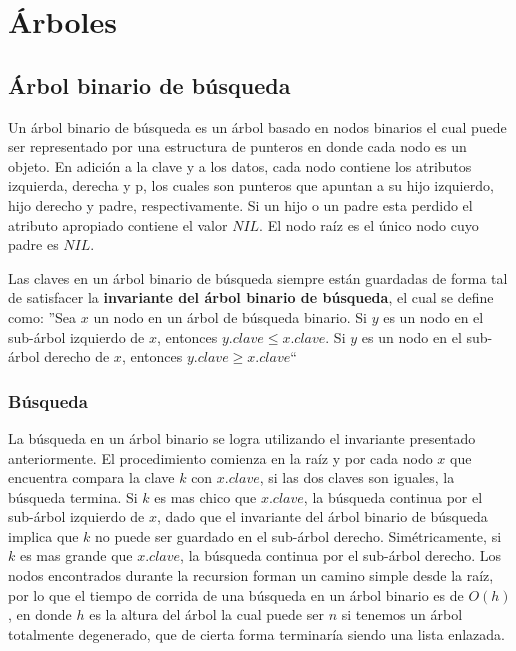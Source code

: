 \newpage
\section{\'Arboles}
\subsection{\'Arbol binario de b\'usqueda}

Un \'arbol binario de b\'usqueda es un \'arbol basado en nodos binarios el cual puede ser representado por una estructura de punteros en donde cada nodo es un objeto. En adici\'on a la clave y a los datos, cada nodo contiene los atributos izquierda, derecha y p, los cuales son punteros que apuntan a su hijo izquierdo, hijo derecho y padre, respectivamente. Si un hijo o un padre esta perdido el atributo apropiado contiene el valor $NIL$. El nodo ra\'iz es el \'unico nodo cuyo padre es $NIL$.

Las claves en un \'arbol binario de b\'usqueda siempre est\'an guardadas de forma tal de satisfacer la \textbf{invariante del \'arbol binario de b\'usqueda}, el cual se define como: ''Sea $x$ un nodo en un \'arbol de b\'usqueda binario. Si $y$ es un nodo en el sub-\'arbol izquierdo de $x$, entonces $y.clave \leq x.clave$. Si $y$ es un nodo en el sub-\'arbol derecho de $x$, entonces $y.clave \geq x.clave$``

\subsubsection{B\'usqueda}

La b\'usqueda en un \'arbol binario se logra utilizando el invariante presentado anteriormente. El procedimiento comienza en la ra\'iz y por cada nodo $x$ que encuentra compara la clave $k$ con $x.clave$, si las dos claves son iguales, la b\'usqueda termina. Si $k$ es mas chico que $x.clave$, la b\'usqueda continua por el sub-\'arbol izquierdo de $x$, dado que el invariante del \'arbol binario de b\'usqueda implica que $k$ no puede ser guardado en el sub-\'arbol derecho. Sim\'etricamente, si $k$ es mas grande que $x.clave$, la b\'usqueda continua por el sub-\'arbol derecho. Los nodos encontrados durante la recursion forman un camino simple desde la ra\'iz, por lo que el tiempo de corrida de una b\'usqueda en un \'arbol binario es de $O(h)$, en donde $h$ es la altura del \'arbol la cual puede ser $n$ si tenemos un \'arbol totalmente degenerado, que de cierta forma terminar\'ia siendo una lista enlazada.

